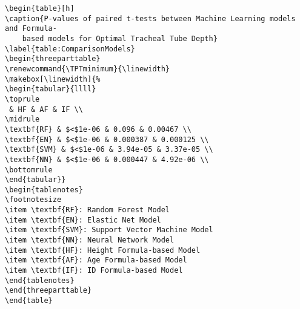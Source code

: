 \documentclass[11pt]{article}
\begin{document}
\begin{Verbatim}[tabsize=4]
\begin{table}[h]
\caption{P-values of paired t-tests between Machine Learning models and Formula-
	based models for Optimal Tracheal Tube Depth}
\label{table:ComparisonModels}
\begin{threeparttable}
\renewcommand{\TPTminimum}{\linewidth}
\makebox[\linewidth]{%
\begin{tabular}{llll}
\toprule
 & HF & AF & IF \\
\midrule
\textbf{RF} & $<$1e-06 & 0.096 & 0.00467 \\
\textbf{EN} & $<$1e-06 & 0.000387 & 0.000125 \\
\textbf{SVM} & $<$1e-06 & 3.94e-05 & 3.37e-05 \\
\textbf{NN} & $<$1e-06 & 0.000447 & 4.92e-06 \\
\bottomrule
\end{tabular}}
\begin{tablenotes}
\footnotesize
\item \textbf{RF}: Random Forest Model
\item \textbf{EN}: Elastic Net Model
\item \textbf{SVM}: Support Vector Machine Model
\item \textbf{NN}: Neural Network Model
\item \textbf{HF}: Height Formula-based Model
\item \textbf{AF}: Age Formula-based Model
\item \textbf{IF}: ID Formula-based Model
\end{tablenotes}
\end{threeparttable}
\end{table}

\end{Verbatim}




\end{document}
